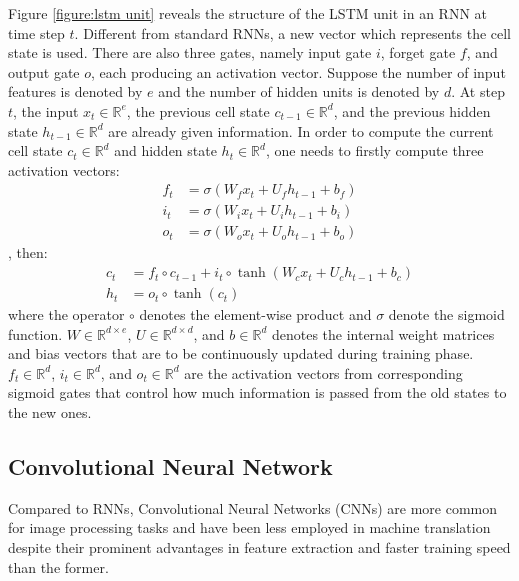 Figure \ref{figure:lstm unit} reveals the structure of the LSTM unit in an RNN at time step $ t $. Different from standard RNNs, a new vector which represents the cell state is used. There are also three gates, namely input gate $i$, forget gate $ f $, and output gate $ o $, each producing an activation vector. Suppose the number of input features is denoted by $ e $ and the number of hidden units is denoted by $ d $. At step $ t $, the input $ x_{t} \in \mathbb{R}^{e} $, the previous cell state $ c_{t-1} \in \mathbb{R}^{d} $, and the previous hidden state $ h_{t-1} \in \mathbb{R}^{d} $ are already given information. In order to compute the current cell state $ c_{t} \in \mathbb{R}^{d} $ and hidden state $ h_{t} \in \mathbb{R}^{d} $, one needs to firstly compute three activation vectors:
\begin{align*}
f_{t} &= \sigma(W_{f}x_{t}+U_{f}h_{t-1}+b_{f}) \\
i_{t} &= \sigma(W_{i}x_{t}+U_{i}h_{t-1}+b_{i}) \\
o_{t} &= \sigma(W_{o}x_{t}+U_{o}h_{t-1}+b_{o})
\end{align*}
, then:
\begin{align*}
c_{t} &= f_{t}\circ c_{t-1}+i_{t}\circ \tanh(W_{c}x_{t}+U_{c}h_{t-1}+b_{c}) \\
h_{t} &= o_{t}\circ \tanh(c_{t})
\end{align*}
where the operator $ \circ $ denotes the element-wise product and $ \sigma $ denote the sigmoid function. $ W \in \mathbb{R}^{d\times e} $, $ U \in \mathbb{R}^{d \times d} $, and $ b \in \mathbb{R}^{d} $ denotes the internal weight matrices and bias vectors that are to be continuously updated during training phase. $ f_{t} \in \mathbb{R}^{d} $, $ i_{t} \in \mathbb{R}^{d} $, and $ o_{t} \in \mathbb{R}^{d} $ are the activation vectors from corresponding sigmoid gates that control how much information is passed from the old states to the new ones.

\subsection{Convolutional Neural Network} \label{subsection:cnn}

Compared to RNNs, Convolutional Neural Networks (CNNs) are more common for image processing tasks and have been less employed in machine translation despite their prominent advantages in feature extraction and faster training speed than the former. 

